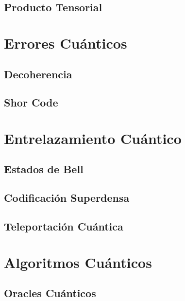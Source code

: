 \documentclass{article}
\numberwithin{equation}{section} %
\begin{document}
    \subsection{Producto Tensorial}


    

    \newpage
    \thispagestyle{empty}
    \mbox{}





    \section{Errores Cuánticos}
    \subsection{Decoherencia}
    \subsection{Shor Code}





    \newpage
    \thispagestyle{empty}
    \mbox{}

    \section{Entrelazamiento Cuántico}
    \subsection{Estados de Bell}
    \subsection{Codificación Superdensa}
    \subsection{Teleportación Cuántica}





    \newpage
    \thispagestyle{empty}
    \mbox{}

    \section{Algoritmos Cuánticos}\label{sec: algoritmos_cuanticos}
    \subsection{Oracles Cuánticos}
\end{document}
